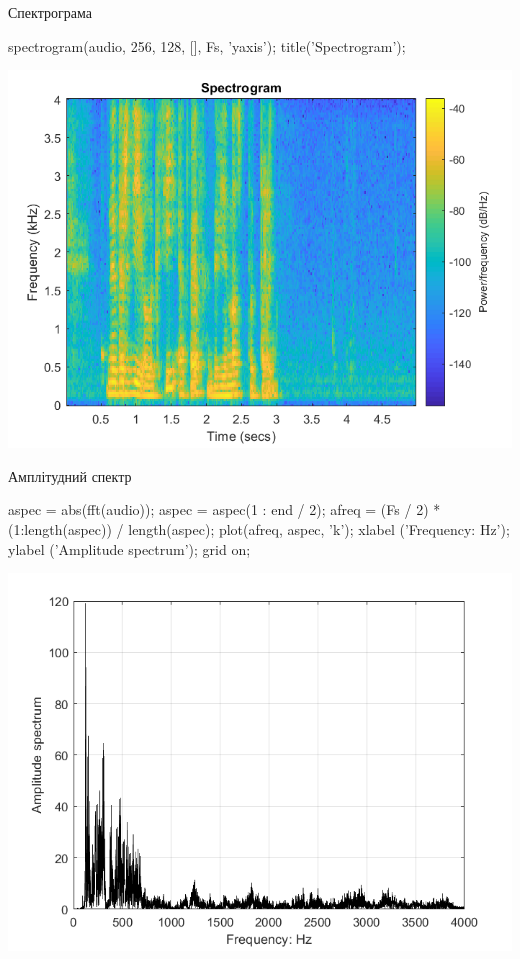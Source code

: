 \documentclass[12pt]{article}
\begin{document}
\begin{par}
\begin{flushleft}
Спектрограма
\end{flushleft}
\end{par}

\begin{matlabcode}
spectrogram(audio, 256, 128, [], Fs, 'yaxis');
title('Spectrogram');
\end{matlabcode}
\begin{center}
\includegraphics[width=\maxwidth{56.196688409433015em}]{figure_1}
\end{center}

\begin{par}
\begin{flushleft}
Амплітудний спектр
\end{flushleft}
\end{par}

\begin{matlabcode}
aspec = abs(fft(audio));
aspec = aspec(1 : end / 2);
afreq = (Fs / 2) * (1:length(aspec)) / length(aspec);
plot(afreq, aspec, 'k');
xlabel ('Frequency: Hz'); ylabel ('Amplitude spectrum');
grid on;
\end{matlabcode}
    \begin{center}
    \includegraphics[width=\maxwidth{56.196688409433015em}]{figure_2}
    \end{center}
\end{document}
